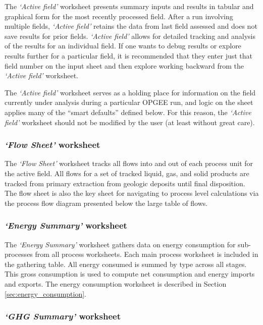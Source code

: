 \documentclass[11pt]{report}
\newcommand{\sheet}[1]{\textit{`{#1}'}}
\begin{document}
The \sheet{Active field} worksheet presents summary inputs and results in tabular and graphical form for the most recently processed field. After a run involving multiple fields, \sheet{Active field} retains the data from last field assessed and does not save results for prior fields. \sheet{Active field} allows for detailed tracking and analysis of the results for an individual field. If one wants to debug results or explore results further for a particular field, it is recommended that they enter just that field number on the input sheet and then explore working backward from the \sheet{Active field} worksheet.

The \sheet{Active field} worksheet serves as a holding place for information on the field currently under analysis during a particular OPGEE run, and logic on the sheet applies many of the ``smart defaults'' defined below. For this reason, the \sheet{Active field} worksheet should not be modified by the user (at least without great care).

\subsubsection{\sheet{Flow Sheet} worksheet} 

The \sheet{Flow Sheet} worksheet tracks all flows into and out of each process unit for the active field. All flows for a set of tracked liquid, gas, and solid products are tracked from primary extraction from geologic deposits until final disposition. The flow sheet is also the key sheet for navigating to process level calculations via the process flow diagram presented below the large table of flows.

\subsubsection{\sheet{Energy Summary} worksheet}

The \sheet{Energy Summary} worksheet gathers data on energy consumption for sub-processes from all process worksheets. Each main process worksheet is included in the gathering table. All energy consumed is summed by type across all stages. This gross consumption is used to compute net consumption and energy imports and exports. The energy consumption worksheet is described in Section \ref{sec:energy_consumption}.

\subsubsection{\sheet{GHG Summary} worksheet} 
\end{document}
